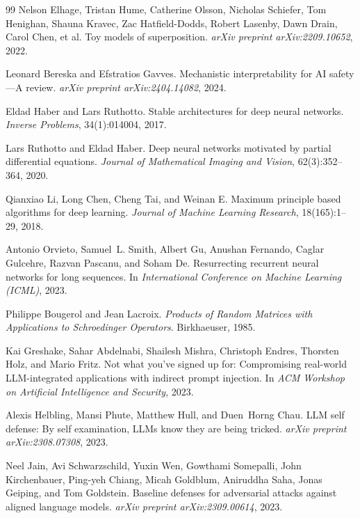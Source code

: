 \documentclass[10pt,twocolumn]{article}
\begin{document}
\begin{thebibliography}{99}
Nelson Elhage, Tristan Hume, Catherine Olsson, Nicholas Schiefer, Tom Henighan, Shauna Kravec, Zac Hatfield-Dodds, Robert Lasenby, Dawn Drain, Carol Chen, et al.
\newblock Toy models of superposition.
\newblock \emph{arXiv preprint arXiv:2209.10652}, 2022.

Leonard Bereska and Efstratios Gavves.
\newblock Mechanistic interpretability for AI safety---A review.
\newblock \emph{arXiv preprint arXiv:2404.14082}, 2024.

Eldad Haber and Lars Ruthotto.
\newblock Stable architectures for deep neural networks.
\newblock \emph{Inverse Problems}, 34(1):014004, 2017.

Lars Ruthotto and Eldad Haber.
\newblock Deep neural networks motivated by partial differential equations.
\newblock \emph{Journal of Mathematical Imaging and Vision}, 62(3):352--364, 2020.

Qianxiao Li, Long Chen, Cheng Tai, and Weinan E.
\newblock Maximum principle based algorithms for deep learning.
\newblock \emph{Journal of Machine Learning Research}, 18(165):1--29, 2018.

Antonio Orvieto, Samuel~L. Smith, Albert Gu, Anushan Fernando, Caglar Gulcehre, Razvan Pascanu, and Soham De.
\newblock Resurrecting recurrent neural networks for long sequences.
\newblock In \emph{International Conference on Machine Learning (ICML)}, 2023.

Philippe Bougerol and Jean Lacroix.
\newblock \emph{Products of Random Matrices with Applications to Schroedinger Operators}.
\newblock Birkhaeuser, 1985.

Kai Greshake, Sahar Abdelnabi, Shailesh Mishra, Christoph Endres, Thorsten Holz, and Mario Fritz.
\newblock Not what you've signed up for: Compromising real-world LLM-integrated applications with indirect prompt injection.
\newblock In \emph{ACM Workshop on Artificial Intelligence and Security}, 2023.

Alexis Helbling, Mansi Phute, Matthew Hull, and Duen~Horng Chau.
\newblock LLM self defense: By self examination, LLMs know they are being tricked.
\newblock \emph{arXiv preprint arXiv:2308.07308}, 2023.

Neel Jain, Avi Schwarzschild, Yuxin Wen, Gowthami Somepalli, John Kirchenbauer, Ping-yeh Chiang, Micah Goldblum, Aniruddha Saha, Jonas Geiping, and Tom Goldstein.
\newblock Baseline defenses for adversarial attacks against aligned language models.
\newblock \emph{arXiv preprint arXiv:2309.00614}, 2023.


\end{thebibliography}
\end{document}
